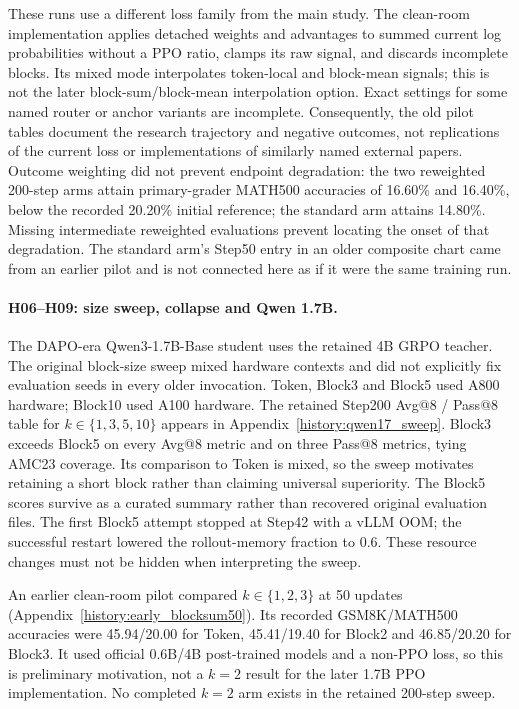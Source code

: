 These runs use a different loss family from the main study. The clean-room implementation applies detached weights and advantages to summed current log probabilities without a PPO ratio, clamps its raw signal, and discards incomplete blocks. Its mixed mode interpolates token-local and block-mean signals; this is not the later block-sum/block-mean interpolation option. Exact settings for some named router or anchor variants are incomplete. Consequently, the old pilot tables document the research trajectory and negative outcomes, not replications of the current loss or implementations of similarly named external papers. Outcome weighting did not prevent endpoint degradation: the two reweighted 200-step arms attain primary-grader MATH500 accuracies of 16.60\% and 16.40\%, below the recorded 20.20\% initial reference; the standard arm attains 14.80\%. Missing intermediate reweighted evaluations prevent locating the onset of that degradation. The standard arm's Step50 entry in an older composite chart came from an earlier pilot and is not connected here as if it were the same training run.

\paragraph{H06--H09: size sweep, collapse and Qwen 1.7B.}
The DAPO-era Qwen3-1.7B-Base student uses the retained 4B GRPO teacher. The original block-size sweep mixed hardware contexts and did not explicitly fix evaluation seeds in every older invocation. Token, Block3 and Block5 used A800 hardware; Block10 used A100 hardware. The retained Step200 Avg@8 / Pass@8 table for $k\in\{1,3,5,10\}$ appears in Appendix~\ref{history:qwen17_sweep}. Block3 exceeds Block5 on every Avg@8 metric and on three Pass@8 metrics, tying AMC23 coverage. Its comparison to Token is mixed, so the sweep motivates retaining a short block rather than claiming universal superiority. The Block5 scores survive as a curated summary rather than recovered original evaluation files. The first Block5 attempt stopped at Step42 with a vLLM OOM; the successful restart lowered the rollout-memory fraction to 0.6. These resource changes must not be hidden when interpreting the sweep.

An earlier clean-room pilot compared $k\in\{1,2,3\}$ at 50 updates (Appendix~\ref{history:early_blocksum50}). Its recorded GSM8K/MATH500 accuracies were 45.94/20.00 for Token, 45.41/19.40 for Block2 and 46.85/20.20 for Block3. It used official 0.6B/4B post-trained models and a non-PPO loss, so this is preliminary motivation, not a $k=2$ result for the later 1.7B PPO implementation. No completed $k=2$ arm exists in the retained 200-step sweep.

